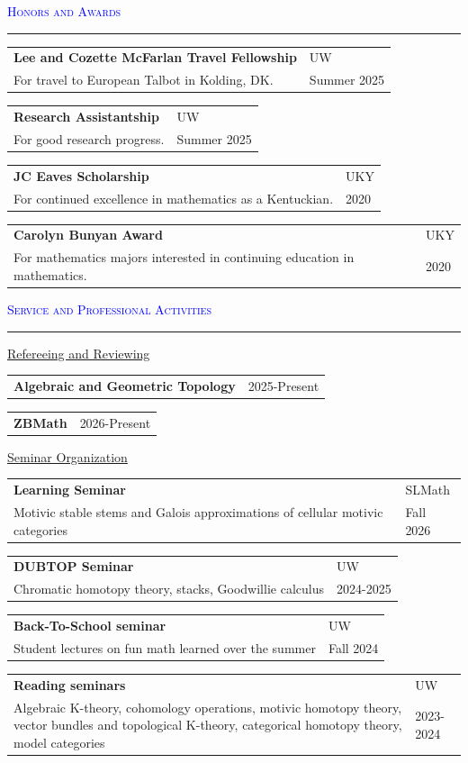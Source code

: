 \documentclass[10pt]{article}
\makeatletter
\newcommand{\grey}[1]{\textcolor{cvgrey}{#1}}
\newcommand{\altarray}[1]{
    \begin{tabular}{>{\raggedright\arraybackslash}p{13cm} @{\hskip 1cm} >{\raggedleft\arraybackslash}p{3.25cm}}
    #1
    \end{tabular}
}
\newenvironment{rSection}[1]{ %
  \medskip
  {\large\scshape\textcolor{Blue}{#1}} %
  \smallskip
  \hrule %
  \begin{list}{}{ %
    \setlength{\leftmargin}{0em} %
  }
  \item[]
}{
  \end{list}
}
\makeatother
\begin{document}
\begin{rSection}{Honors and Awards}
\altarray{\textbf{Lee and Cozette McFarlan Travel Fellowship} & \footnotesize UW\\
\grey{For travel to European Talbot in Kolding, DK.} & \footnotesize{\grey{Summer 2025}}
} %

\altarray{\textbf{Research Assistantship} & \footnotesize UW\\
\grey{For good research progress.} & \footnotesize \grey{Summer 2025}
} %

\altarray{
    \textbf{JC Eaves Scholarship} & \footnotesize UKY\\
    \grey{For continued excellence in mathematics as a Kentuckian.} & \footnotesize \grey{2020}
} %


\altarray{
    \textbf{Carolyn Bunyan Award} & \footnotesize UKY\\
    \grey{For mathematics majors interested in continuing education in mathematics.} & \footnotesize \grey{2020}
} %

\end{rSection}
\begin{rSection}{Service and Professional Activities}
\underline{Refereeing and Reviewing}

    \altarray{
    \textbf{Algebraic and Geometric Topology}
     & \footnotesize \grey{2025-Present}
    }
     \altarray{
    \textbf{ZBMath}
    & \footnotesize \grey{2026-Present}
    }


\newpage
\underline{Seminar Organization}

    \altarray{
        \textbf{Learning Seminar} & \footnotesize SLMath\\
        \grey{Motivic stable stems and Galois approximations of cellular motivic categories} & \footnotesize \grey{Fall 2026}
    }

    \altarray{
    \textbf{DUBTOP Seminar}   & \footnotesize UW\\
    \grey{Chromatic homotopy theory, stacks, Goodwillie calculus} & \footnotesize \grey{2024-2025}
    }

    \altarray{
        \textbf{Back-To-School seminar} & \footnotesize UW\\
        \grey{Student lectures on fun math learned over the summer} & \footnotesize \grey{Fall 2024}
    }

    \altarray{
        \textbf{Reading seminars}   & \footnotesize UW\\ 
        \grey{Algebraic K-theory, cohomology operations, motivic homotopy theory, vector bundles and topological K-theory, categorical homotopy theory, model categories} & \footnotesize \grey{2023-2024}
    }

\end{rSection}
\end{document}
